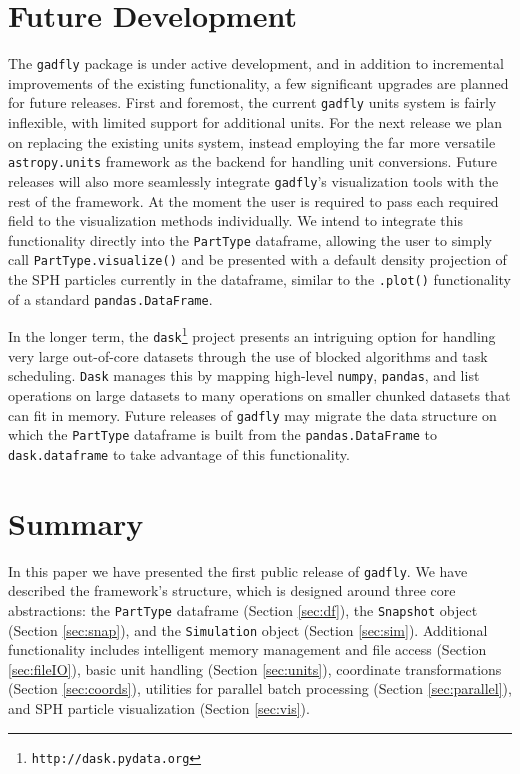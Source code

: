 \documentclass{thesis}
\newcommand{\code}[1]{\texttt{#1}}
\begin{document}
\section{Future Development}
\label{sec:future}
The \code{gadfly} package is under active development, and in addition to incremental improvements of the existing functionality, a few significant upgrades are planned for future releases.  
First and foremost, the current \code{gadfly} units system is fairly inflexible, with limited support for additional units.  
For the next release we plan on replacing the existing units system, instead employing the far more versatile \code{astropy.units} framework \citep{Robitailleetal2013} as the backend for handling unit conversions. 
Future releases will also more seamlessly integrate \code{gadfly}'s visualization tools with the rest of the framework.  
At the moment the user is required to pass each required field to the visualization methods individually.
We intend to integrate this functionality directly into the \code{PartType} dataframe, allowing the user to simply call \code{PartType.visualize()} and be presented with a default density projection of the SPH particles currently in the dataframe, similar to the \code{.plot()} functionality of a standard \code{pandas.DataFrame}.

In the longer term, the \code{dask}\footnote{\code{http://dask.pydata.org}} project presents an intriguing option for handling very large out-of-core datasets through the use of blocked algorithms and task scheduling.
\code{Dask} manages this by mapping high-level \code{numpy}, \code{pandas}, and list operations on large datasets to many operations on smaller chunked datasets that can fit in memory.  
Future releases of \code{gadfly} may migrate the data structure on which the \code{PartType} dataframe is built from the \code{pandas.DataFrame} to \code{dask.dataframe} to take advantage of this functionality.

\section{Summary}
\label{sec:summary}
In this paper we have presented the first public release of \code{gadfly}.  We have described the framework's structure, which is designed around three core abstractions: the \code{PartType} dataframe (Section \ref{sec:df}), the \code{Snapshot} object (Section \ref{sec:snap}), and the \code{Simulation} object (Section \ref{sec:sim}).  Additional functionality includes intelligent memory management and file access (Section \ref{sec:fileIO}), basic unit handling (Section \ref{sec:units}), coordinate transformations (Section \ref{sec:coords}), utilities for parallel batch processing (Section \ref{sec:parallel}), and SPH particle visualization (Section \ref{sec:vis}).
\end{document}
